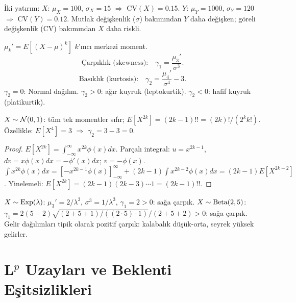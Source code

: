 \begin{ornek}[CV Karşılaştırması]
İki yatırım:
$X$: $\mu_X = 100$, $\sigma_X = 15$ $\Rightarrow$ $\mathrm{CV}(X) = 0.15$.
$Y$: $\mu_Y = 1000$, $\sigma_Y = 120$ $\Rightarrow$ $\mathrm{CV}(Y) = 0.12$.
Mutlak değişkenlik ($\sigma$) bakımından $Y$ daha değişken;
göreli değişkenlik (CV) bakımından $X$ daha riskli.
\end{ornek}

\begin{tanim}
\label{def:carpiklik_basiklik}
$\mu_k' = E[(X-\mu)^k]$ $k$'ıncı merkezi moment.
\[
  \text{Çarpıklık (skewness):} \quad \gamma_1 = \frac{\mu_3'}{\sigma^3}.
\]
\[
  \text{Basıklık (kurtosis):} \quad \gamma_2 = \frac{\mu_4'}{\sigma^4} - 3.
\]
$\gamma_2 = 0$: Normal dağılım. $\gamma_2 > 0$: ağır kuyruk (leptokurtik).
$\gamma_2 < 0$: hafif kuyruk (platikurtik).
\end{tanim}

\begin{teorem}
\label{thm:normal_momentler}
$X \sim \mathcal{N}(0,1)$: tüm tek momentler sıfır;
$E[X^{2k}] = (2k-1)!! = (2k)!/(2^k k!)$.
Özellikle: $E[X^4] = 3$ $\Rightarrow$ $\gamma_2 = 3 - 3 = 0$.
\end{teorem}

\begin{proof}
$E[X^{2k}] = \int_{-\infty}^\infty x^{2k} \phi(x) dx$.
Parçalı integral: $u = x^{2k-1}$, $dv = x\phi(x)dx = -\phi'(x)dx$; $v = -\phi(x)$.
$\int x^{2k}\phi(x)dx = [-x^{2k-1}\phi(x)]_{-\infty}^\infty + (2k-1)\int x^{2k-2}\phi(x)dx = (2k-1)E[X^{2k-2}]$.
Yinelemeli: $E[X^{2k}] = (2k-1)(2k-3)\cdots 1 = (2k-1)!!$.
\end{proof}

\begin{ornek}
$X \sim \operatorname{Exp}(\lambda)$: $\mu_3' = 2/\lambda^3$, $\sigma^3 = 1/\lambda^3$, $\gamma_1 = 2 > 0$: sağa çarpık.
$X \sim \operatorname{Beta}(2,5)$: $\gamma_1 = 2(5-2)\sqrt{(2+5+1)/((2\cdot5)\cdot 1)} / (2+5+2) > 0$: sağa çarpık.
Gelir dağılımları tipik olarak pozitif çarpık: kalabalık düşük-orta, seyrek yüksek gelirler.
\end{ornek}

\section{L$^p$ Uzayları ve Beklenti Eşitsizlikleri}
\label{sec:lp_uzaylari}

